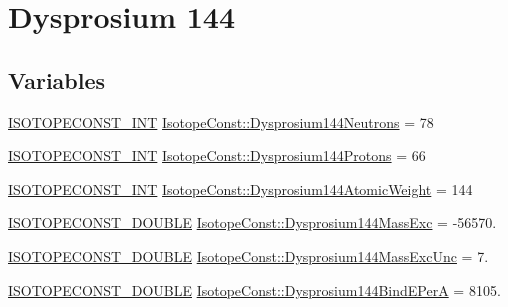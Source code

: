 \hypertarget{group___isotope_const-_dysprosium-_dy144}{}\section{Dysprosium 144}
\label{group___isotope_const-_dysprosium-_dy144}
\subsection*{Variables}
\begin{DoxyCompactItemize}
\item 
\mbox{\hyperlink{group___isotope_const-_macros_ga5f18360b3e99483a35c32d789e62621c}{I\+S\+O\+T\+O\+P\+E\+C\+O\+N\+S\+T\+\_\+\+I\+NT}} \mbox{\hyperlink{group___isotope_const-_dysprosium-_dy144_gacc3d80b8fcee15009063a522ef0c15e5}{Isotope\+Const\+::\+Dysprosium144\+Neutrons}} = 78
\item 
\mbox{\hyperlink{group___isotope_const-_macros_ga5f18360b3e99483a35c32d789e62621c}{I\+S\+O\+T\+O\+P\+E\+C\+O\+N\+S\+T\+\_\+\+I\+NT}} \mbox{\hyperlink{group___isotope_const-_dysprosium-_dy144_ga572b32eb6c1c9975a5da644d22f0d3c2}{Isotope\+Const\+::\+Dysprosium144\+Protons}} = 66
\item 
\mbox{\hyperlink{group___isotope_const-_macros_ga5f18360b3e99483a35c32d789e62621c}{I\+S\+O\+T\+O\+P\+E\+C\+O\+N\+S\+T\+\_\+\+I\+NT}} \mbox{\hyperlink{group___isotope_const-_dysprosium-_dy144_ga12fe77ac571e7d54fababeffc51b6e08}{Isotope\+Const\+::\+Dysprosium144\+Atomic\+Weight}} = 144
\item 
\mbox{\hyperlink{group___isotope_const-_macros_ga8f45a7272ce02c0b4c65c44636ed719a}{I\+S\+O\+T\+O\+P\+E\+C\+O\+N\+S\+T\+\_\+\+D\+O\+U\+B\+LE}} \mbox{\hyperlink{group___isotope_const-_dysprosium-_dy144_gaacbc74c6591b68b114c99339187f8a3a}{Isotope\+Const\+::\+Dysprosium144\+Mass\+Exc}} = -\/56570.
\item 
\mbox{\hyperlink{group___isotope_const-_macros_ga8f45a7272ce02c0b4c65c44636ed719a}{I\+S\+O\+T\+O\+P\+E\+C\+O\+N\+S\+T\+\_\+\+D\+O\+U\+B\+LE}} \mbox{\hyperlink{group___isotope_const-_dysprosium-_dy144_ga1ef1e03ad42756d880db389bfe5aabc4}{Isotope\+Const\+::\+Dysprosium144\+Mass\+Exc\+Unc}} = 7.
\item 
\mbox{\hyperlink{group___isotope_const-_macros_ga8f45a7272ce02c0b4c65c44636ed719a}{I\+S\+O\+T\+O\+P\+E\+C\+O\+N\+S\+T\+\_\+\+D\+O\+U\+B\+LE}} \mbox{\hyperlink{group___isotope_const-_dysprosium-_dy144_ga53709cd24e4d9b2eec9090aaeacd31ff}{Isotope\+Const\+::\+Dysprosium144\+Bind\+E\+PerA}} = 8105.

\end{DoxyCompactItemize}
